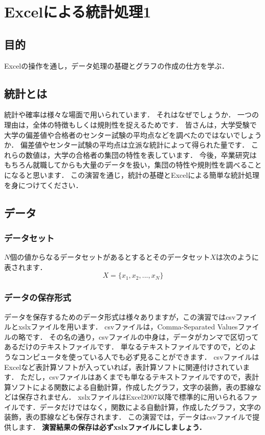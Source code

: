 
\chapter{Excelによる統計処理1}
\setcounter{num_prac}{0}

\section{目的}

Excelの操作を通し，データ処理の基礎とグラフの作成の仕方を学ぶ．

\section{統計とは}

統計や確率は様々な場面で用いられています．
それはなぜでしょうか．
一つの理由は，全体の特徴もしくは規則性を捉えるためです．
皆さんは，大学受験で大学の偏差値や合格者のセンター試験の平均点などを調べたのではないでしょうか．
偏差値やセンター試験の平均点は立派な統計によって得られた量です．
これらの数値は，大学の合格者の集団の特性を表しています．
今後，卒業研究はもちろん就職してからも大量のデータを扱い，集団の特性や規則性を調べることになると思います．
この演習を通じ，統計の基礎とExcelによる簡単な統計処理を身につけてください．

\section{データ}
\subsection{データセット}

$N$個の値からなるデータセットがあるとするとそのデータセット$X$は次のように表されます．
\begin{equation}
    \label{eq:2}
    X = \{x_1, x_2, ..., x_N\}
\end{equation}

\subsection{データの保存形式}

データを保存するためのデータ形式は様々ありますが，この演習ではcsvファイルとxslxファイルを用います．
csvファイルは，Comma-Separated Valuesファイルの略です．
その名の通り，csvファイルの中身は，データがカンマで区切ってあるだけのテキストファイルです．
単なるテキストファイルですので，どのようなコンピュータを使っている人でも必ず見ることができます．
csvファイルはExcelなど表計算ソフトが入っていれば，表計算ソフトに関連付けされています．
ただし，csvファイルはあくまでも単なるテキストファイルですので，表計算ソフトによる関数による自動計算，作成したグラフ，文字の装飾，表の罫線などは保存されません．
xslxファイルはExcel2007以降で標準的に用いられるファイルです．データだけではなく，関数による自動計算，作成したグラフ，文字の装飾，表の罫線なども保存されます．
この演習では，データはcsvファイルで提供します．
\textbf{演習結果の保存は必ずxslxファイルにしましょう．}

